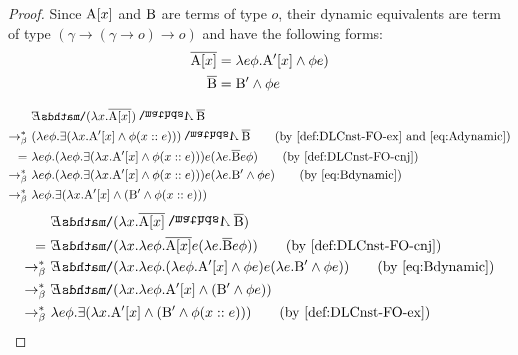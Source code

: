 \begin{proof} Since $\A1[\x1]$ and $\B1$ are terms of type $o$, their dynamic equivalents are term of type $(\gamma \rightarrow (\gamma \rightarrow o) \rightarrow o)$ and have the following forms:
\begin{subequations}
\begin{align}
 \tr{\A1[\x1]}  & = \lambda e \phi. \A1'[x] \land \phi e) \label{eq:Adynamic} \\
 \tr{\B1} & = \B1' \land  \phi e \label{eq:Bdynamic} 
\end{align}
\end{subequations}

%
\begin{align}
 &  {\ex2} (\lambda \x1.  \tr{\A1[\x1]}) \cnj2 \tr{\B1}  \notag \\ 
 \bred \  &  ( \lambda e \phi.  \exists ( \lambda \x1. \A1'[x] \land \phi (x::e) ) )  \cnj2  \tr{\B1}  \tag{by~\eqref{def:DLCnst-FO-ex} and~\eqref{eq:Adynamic}}\\
= \ &  \lambda e \phi. ( \lambda e \phi.  \exists ( \lambda \x1. \A1'[x] \land \phi (x::e) ) ) e ( \lambda e. \tr{\B1} e \phi  ) \tag{by~\eqref{def:DLCnst-FO-cnj}} \\
\bred \ &   \lambda e \phi. ( \lambda e \phi.  \exists ( \lambda \x1. \A1'[x] \land \phi (x::e) ) ) e ( \lambda e. \B1' \land  \phi e  )  \tag{by~\eqref{eq:Bdynamic}}\\
\bred \ &   \lambda e \phi.  \exists ( \lambda \x1. \A1'[x] \land  (  \B1' \land  \phi  (x::e)  ) ) \label{eq:DLGexscope1}
\end{align}
%
\begin{align}
 &  \ex2 (\lambda \x1.  \tr{\A1[\x1]}  \cnj2  \tr{\B1} ) \notag \\
  = \ &    \ex2 (\lambda \x1.  \lambda e \phi. \tr{\A1[\x1]}  e (\lambda e. \tr{\B1}  e \phi)  ) \tag{by~\eqref{def:DLCnst-FO-cnj}} \\
  \bred \ &  \ex2 (\lambda \x1.  \lambda e \phi. (\lambda e \phi. \A1'[x] \land \phi e ) e (\lambda e. \B1' \land  \phi e)  ) \tag{by~\eqref{eq:Bdynamic}}\\
    \bred \ &   \ex2 (\lambda \x1.  \lambda e \phi.\A1'[x] \land  (\B1' \land  \phi e )   ) \notag \\
\bred \ &   \lambda e \phi.  \exists ( \lambda \x1.   \A1'[x] \land  (  \B1' \land  \phi ( \x1:: e ) ) ) \tag{by~\eqref{def:DLCnst-FO-ex}}
\end{align}
%
\end{proof}

